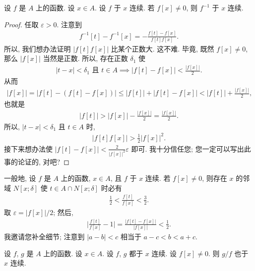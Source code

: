 \begin{theorem}
    设 $f$ 是 $A$ 上的函数. 设 $x \in A$. 设 $f$ 于 $x$ 连续. 若 $f[x] \neq 0$, 则 $f^{-1}$ 于 $x$ 连续.
\end{theorem}

\begin{proof}
    任取 $\varepsilon > 0$. 注意到
    \begin{align*}
        f^{-1} [t] - f^{-1} [x] = -\frac{f[t] - f[x]}{f[t] f[x]}.
    \end{align*}
    所以, 我们想办法证明 $|f[t] f[x]|$ 比某个正数大. 这不难. 毕竟, 既然 $f[x] \neq 0$, 那么 $|f[x]|$ 当然是正数. 所以, 存在正数 $\delta_1$ 使
    \begin{align*}
        \text{$|t - x| < \delta_1$ 且 $t \in A$} \implies |f[t] - f[x]| < \frac{|f[x]|}{2}.
    \end{align*}
    从而
    \begin{align*}
        |f[x]| = |f[t] - (f[t] - f[x])| \leq |f[t]| + |f[t] - f[x]| < |f[t]| + \frac{|f[x]|}{2},
    \end{align*}
    也就是
    \begin{align*}
        |f[t]| > |f[x]| - \frac{|f[x]|}{2} = \frac{|f[x]|}{2}.
    \end{align*}
    所以, $|t - x| < \delta_1$ 且 $t \in A$ 时,
    \begin{align*}
        |f[t] f[x]| > \frac{1}{2} |f[x]|^2.
    \end{align*}
    接下来想办法使 $|f[t] - f[x]| < \frac{2}{|f[x]|^2} \varepsilon$ 即可. 我十分信任您; 您一定可以写出此事的论证的, 对吧?
\end{proof}

\begin{remark}
    一般地, 设 $f$ 是 $A$ 上的函数, $x \in A$, 且 $f$ 于 $x$ 连续. 若 $f[x] \neq 0$, 则存在 $x$ 的邻域 $N[x; \delta]$ 使 $t \in A \cap N[x; \delta]$ 时必有
    \begin{align*}
        \frac{1}{2} < \frac{f[t]}{f[x]} < \frac{3}{2}.
    \end{align*}
    取 $\varepsilon = |f[x]|/2$; 然后,
    \begin{align*}
        \Bigg| \frac{f[t]}{f[x]} - 1 \Bigg| = \frac{|f[t] - f[x]|}{|f[x]|} < \frac{1}{2}.
    \end{align*}
    我邀请您补全细节; 注意到 $|a - b| < c$ 相当于 $a - c < b < a + c$.
\end{remark}

\begin{theorem}
    设 $f$, $g$ 是 $A$ 上的函数. 设 $x \in A$. 设 $f$, $g$ 都于 $x$ 连续. 设 $f[x] \neq 0$. 则 $g/f$ 也于 $x$ 连续.
\end{theorem}

